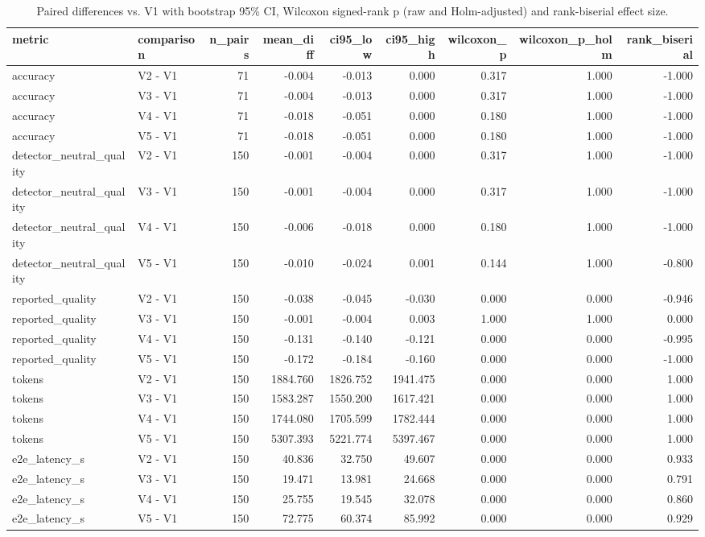 \begin{table}[t]
\centering
\small
\begin{tabular}{llrrrrrrr}
\toprule
metric & comparison & n\_pairs & mean\_diff & ci95\_low & ci95\_high & wilcoxon\_p & wilcoxon\_p\_holm & rank\_biserial \\
\midrule
accuracy & V2 - V1 & 71 & -0.004 & -0.013 & 0.000 & 0.317 & 1.000 & -1.000 \\
accuracy & V3 - V1 & 71 & -0.004 & -0.013 & 0.000 & 0.317 & 1.000 & -1.000 \\
accuracy & V4 - V1 & 71 & -0.018 & -0.051 & 0.000 & 0.180 & 1.000 & -1.000 \\
accuracy & V5 - V1 & 71 & -0.018 & -0.051 & 0.000 & 0.180 & 1.000 & -1.000 \\
detector\_neutral\_quality & V2 - V1 & 150 & -0.001 & -0.004 & 0.000 & 0.317 & 1.000 & -1.000 \\
detector\_neutral\_quality & V3 - V1 & 150 & -0.001 & -0.004 & 0.000 & 0.317 & 1.000 & -1.000 \\
detector\_neutral\_quality & V4 - V1 & 150 & -0.006 & -0.018 & 0.000 & 0.180 & 1.000 & -1.000 \\
detector\_neutral\_quality & V5 - V1 & 150 & -0.010 & -0.024 & 0.001 & 0.144 & 1.000 & -0.800 \\
reported\_quality & V2 - V1 & 150 & -0.038 & -0.045 & -0.030 & 0.000 & 0.000 & -0.946 \\
reported\_quality & V3 - V1 & 150 & -0.001 & -0.004 & 0.003 & 1.000 & 1.000 & 0.000 \\
reported\_quality & V4 - V1 & 150 & -0.131 & -0.140 & -0.121 & 0.000 & 0.000 & -0.995 \\
reported\_quality & V5 - V1 & 150 & -0.172 & -0.184 & -0.160 & 0.000 & 0.000 & -1.000 \\
tokens & V2 - V1 & 150 & 1884.760 & 1826.752 & 1941.475 & 0.000 & 0.000 & 1.000 \\
tokens & V3 - V1 & 150 & 1583.287 & 1550.200 & 1617.421 & 0.000 & 0.000 & 1.000 \\
tokens & V4 - V1 & 150 & 1744.080 & 1705.599 & 1782.444 & 0.000 & 0.000 & 1.000 \\
tokens & V5 - V1 & 150 & 5307.393 & 5221.774 & 5397.467 & 0.000 & 0.000 & 1.000 \\
e2e\_latency\_s & V2 - V1 & 150 & 40.836 & 32.750 & 49.607 & 0.000 & 0.000 & 0.933 \\
e2e\_latency\_s & V3 - V1 & 150 & 19.471 & 13.981 & 24.668 & 0.000 & 0.000 & 0.791 \\
e2e\_latency\_s & V4 - V1 & 150 & 25.755 & 19.545 & 32.078 & 0.000 & 0.000 & 0.860 \\
e2e\_latency\_s & V5 - V1 & 150 & 72.775 & 60.374 & 85.992 & 0.000 & 0.000 & 0.929 \\
\bottomrule
\end{tabular}
\caption{Paired differences vs. V1 with bootstrap 95\% CI, Wilcoxon signed-rank p (raw and Holm-adjusted) and rank-biserial effect size.}
\label{tab:rigor_paired_tests}
\end{table}
